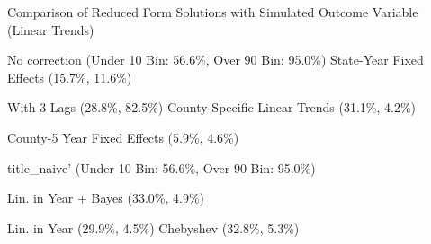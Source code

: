 \caption{Comparison of Reduced Form Solutions with Simulated Outcome Variable (Linear Trends) \label{fig:distributions-existing-solutions}}
\caption*{\color{p1line}{\textbf{\textemdash\textemdash}} No correction (Under 10 Bin: 56.6\%, Over 90 Bin: 95.0\%) \hspace{1cm} \color{p2line}{- - -} State-Year Fixed Effects (15.7\%, 11.6\%)}
\caption*{\color{p3line}{\textbf{- - -}} With 3 Lags (28.8\%, 82.5\%) \hspace{1cm} \color{p4line}{\textbf{- - -}} County-Specific Linear Trends (31.1\%, 4.2\%)}
\caption*{\color{p5line}{\textbf{- - -}} County-5 Year Fixed Effects (5.9\%, 4.6\%)}


\caption*{\color{p1line}{\textbf{\textemdash\textemdash}} title_naive' (Under 10 Bin: 56.6\%, Over 90 Bin: 95.0\%)}
\caption*{\color{p2line}{\textbf{- - -}} Lin. in Year + Bayes (33.0\%, 4.9\%)}
\caption*{\color{p3line}{\textbf{- - -}} Lin. in Year (29.9\%, 4.5\%) \hspace{1cm} \color{p4line}{\textbf{- - -}} Chebyshev (32.8\%, 5.3\%)}